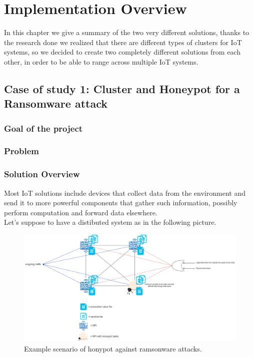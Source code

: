 \chapter{Implementation Overview}

In this chapter we give a summary of the two very different solutions, thanks to the research done we realized that there are different types of clusters for IoT systems, so we decided to create two completely different solutions from each other, in order to be able to range across multiple IoT systems.

\section{Case of study 1: Cluster and Honeypot for a Ransomware attack}

\subsection{Goal of the project}



\subsection{Problem}



\subsection{Solution Overview}

Most IoT solutions include devices that collect data from the environment and send it to more powerful components that gather such information, possibly perform computation and forward data elsewhere.\\
Let's suppose to have a distibuted system as in the following picture.


\begin{figure}[h!]
  \centering
  \includegraphics[width = 16cm]{images/ramsonwareHoneypot.png}
  \caption{ Example scenario of honypot against ramsonware attacks.}
  \label{fig:irradiances}
\end{figure}
\FloatBarrier

